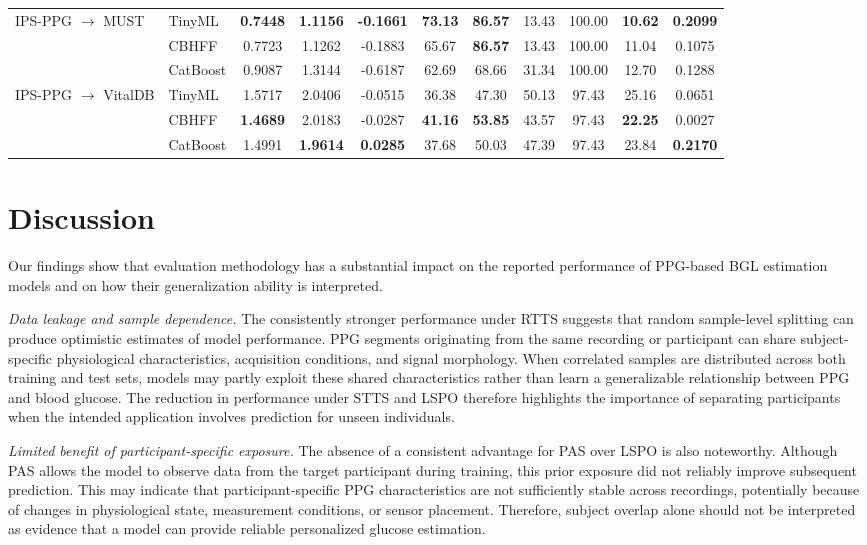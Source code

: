 \documentclass{article}
\begin{document}
\begin{table}[H]
{\begin{tabular}{llccccccccc}
\multirow{3}{*}{IPS-PPG $\rightarrow$ MUST}
& TinyML & \textbf{0.7448} & \textbf{1.1156} & \textbf{-0.1661} & \textbf{73.13} & \textbf{86.57} & 13.43 & 100.00 & \textbf{10.62} & \textbf{0.2099} \\
& CBHFF    & 0.7723 & 1.1262 & -0.1883 & 65.67 & \textbf{86.57} & 13.43 & 100.00 & 11.04 & 0.1075 \\
& CatBoost & 0.9087 & 1.3144 & -0.6187 & 62.69 & 68.66 & 31.34 & 100.00 & 12.70 & 0.1288 \\
\midrule

\multirow{3}{*}{IPS-PPG $\rightarrow$ VitalDB}
& TinyML & 1.5717 & 2.0406 & -0.0515 & 36.38 & 47.30 & 50.13 & 97.43 & 25.16 & 0.0651 \\
& CBHFF    & \textbf{1.4689} & 2.0183 & -0.0287 & \textbf{41.16} & \textbf{53.85} & 43.57 & 97.43 & \textbf{22.25} & 0.0027 \\
& CatBoost & 1.4991 & \textbf{1.9614} & \textbf{0.0285} & 37.68 & 50.03 & 47.39 & 97.43 & 23.84 & \textbf{0.2170} \\
\bottomrule

\end{tabular}
}
\end{table}




\section{Discussion}

Our findings show that evaluation methodology has a substantial impact on the reported performance of PPG-based BGL estimation models and on how their generalization ability is interpreted.

\textit{Data leakage and sample dependence.}
The consistently stronger performance under RTTS suggests that random sample-level splitting can produce optimistic estimates of model performance. PPG segments originating from the same recording or participant can share subject-specific physiological characteristics, acquisition conditions, and signal morphology. When correlated samples are distributed across both training and test sets, models may partly exploit these shared characteristics rather than learn a generalizable relationship between PPG and blood glucose. The reduction in performance under STTS and LSPO therefore highlights the importance of separating participants when the intended application involves prediction for unseen individuals.

\textit{Limited benefit of participant-specific exposure.}
The absence of a consistent advantage for PAS over LSPO is also noteworthy. Although PAS allows the model to observe data from the target participant during training, this prior exposure did not reliably improve subsequent prediction. This may indicate that participant-specific PPG characteristics are not sufficiently stable across recordings, potentially because of changes in physiological state, measurement conditions, or sensor placement. Therefore, subject overlap alone should not be interpreted as evidence that a model can provide reliable personalized glucose estimation.
\end{document}
